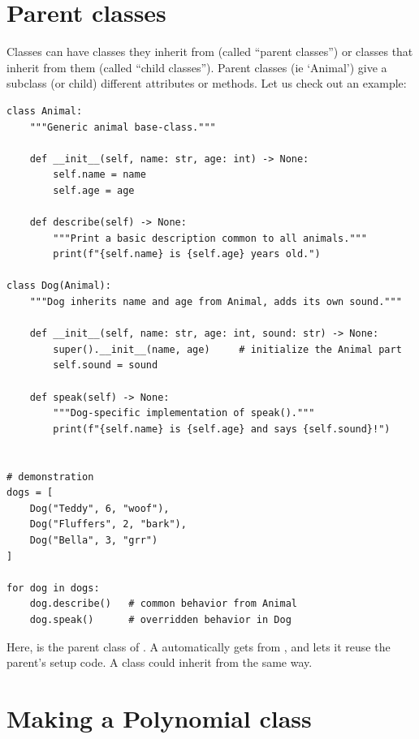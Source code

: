 \section{Parent classes}
Classes can have classes they inherit from (called ``parent classes'') or classes that 
inherit from them (called ``child classes''). 
Parent classes (ie `Animal') give a subclass (or child) different attributes or methods. Let us check out an example:

\begin{verbatim}
class Animal:
    """Generic animal base-class."""

    def __init__(self, name: str, age: int) -> None:
        self.name = name
        self.age = age

    def describe(self) -> None:
        """Print a basic description common to all animals."""
        print(f"{self.name} is {self.age} years old.")

class Dog(Animal):
    """Dog inherits name and age from Animal, adds its own sound."""

    def __init__(self, name: str, age: int, sound: str) -> None:
        super().__init__(name, age)     # initialize the Animal part
        self.sound = sound

    def speak(self) -> None:
        """Dog-specific implementation of speak()."""
        print(f"{self.name} is {self.age} and says {self.sound}!")


# demonstration
dogs = [
    Dog("Teddy", 6, "woof"),
    Dog("Fluffers", 2, "bark"),
    Dog("Bella", 3, "grr")
]

for dog in dogs:
    dog.describe()   # common behavior from Animal
    dog.speak()      # overridden behavior in Dog

\end{verbatim}

Here,  is the parent class of . A
 automatically gets  from
, and  lets it reuse the
parent's setup code. A  class could inherit from
 the same way.
\section{Making a Polynomial class}

